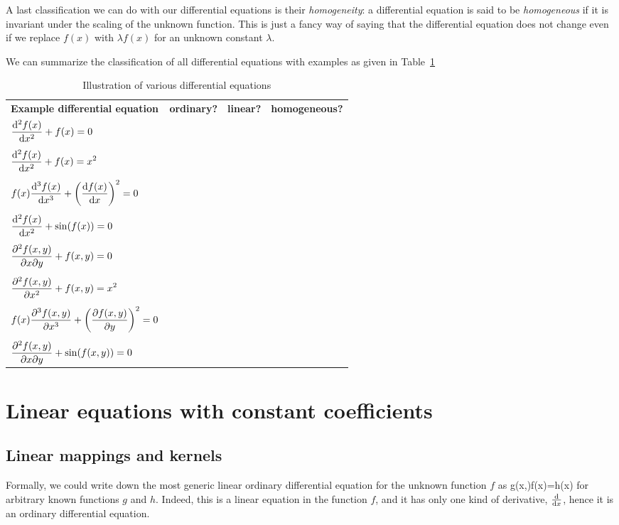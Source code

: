 A last classification we can do with our differential equations is their \emph{homogeneity}: a differential equation is said to be \emph{homogeneous} if it is invariant under the scaling of the unknown function. This is just a fancy way of saying that the differential equation does not change even if we replace $f(x)$ with $\lambda f(x)$ for an unknown constant $\lambda$.  

We can summarize the classification of all differential equations with examples as given in Table~\ref{table: Illustration of various differential equations}
\begin{table}
	\caption{\label{table: Illustration of various differential equations}Illustration of various differential equations}
	\centering
	\footnotesize
	\begin{tabular}{llll}
		\textbf{Example differential equation}&\textbf{ordinary?}&\textbf{linear?}&\textbf{homogeneous?}\\
		$\displaystyle\frac{\dd ^2f(x)}{\dd x^2}+f(x)=0$&\cmark&\cmark&\cmark
		\\\\
		$\displaystyle\frac{\dd ^2f(x)}{\dd x^2}+f(x)=x^2$&\cmark&\cmark&\xmark
		\\\\
		$\displaystyle f(x)\frac{\dd ^3f(x)}{\dd x^3}+\left(\frac{\dd f(x)}{\dd x}\right)^2=0$&\cmark&\xmark&\cmark
		\\\\
		$\displaystyle\frac{\dd ^2f(x)}{\dd x^2}+\sin(f(x))=0$&\cmark&\xmark&\xmark
		\\\\
		$\displaystyle\frac{\partial ^2f(x,y)}{\partial x\partial y}+f(x,y)=0$&\xmark&\cmark&\cmark
		\\\\
		$\displaystyle\frac{\partial ^2f(x,y)}{\partial x^2}+f(x,y)=x^2$&\xmark&\cmark&\xmark
		\\\\
		$\displaystyle f(x)\frac{\partial ^3f(x,y)}{\partial x^3}+\left(\frac{\partial f(x,y)}{\partial y}\right)^2=0$&\xmark&\xmark&\cmark
		\\\\
		$\displaystyle\frac{\partial ^2f(x,y)}{\partial x\partial y}+\sin(f(x,y))=0$&\xmark&\xmark&\xmark
	\end{tabular}
\end{table}

\chapter{Linear equations with constant coefficients}
\section{Linear mappings and kernels}
Formally, we could write down the most generic linear ordinary differential equation for the unknown function $f$ as
\be 
g\left(x,\right)f(x)=h(x)
\ee 
for arbitrary known functions $g$ and $h$. Indeed, this is a linear equation in the function $f$, and it has only one kind of derivative, $\frac{\dd }{\dd x}$, hence it is an ordinary differential equation.

